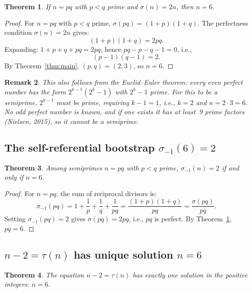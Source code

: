\documentclass{amsart}
\newtheorem{theorem}{Theorem}[section]
\newtheorem{remark}[theorem]{Remark}
\begin{document}
\begin{theorem}\label{thm:semiprime-perfect}
If $n = pq$ with $p < q$ prime and $\sigma(n) = 2n$, then $n = 6$.
\end{theorem}

\begin{proof}
For $n = pq$ with $p < q$ prime, $\sigma(pq) = (1+p)(1+q)$. The perfectness condition $\sigma(n) = 2n$ gives:
\[
(1 + p)(1 + q) = 2pq.
\]
Expanding: $1 + p + q + pq = 2pq$, hence $pq - p - q - 1 = 0$, i.e.,
\[
(p - 1)(q - 1) = 2.
\]
By Theorem~\ref{thm:main}, $(p, q) = (2, 3)$, so $n = 6$.
\end{proof}

\begin{remark}
This also follows from the Euclid--Euler theorem: every even perfect number has the form $2^{k-1}(2^k - 1)$ with $2^k - 1$ prime. For this to be a semiprime, $2^{k-1}$ must be prime, requiring $k - 1 = 1$, i.e., $k = 2$ and $n = 2 \cdot 3 = 6$. No odd perfect number is known, and if one exists it has at least~9 prime factors (Nielsen, 2015), so it cannot be a semiprime.
\end{remark}

\subsection{The self-referential bootstrap $\sigma_{-1}(6) = 2$}

\begin{theorem}\label{thm:sigma-neg1}
Among semiprimes $n = pq$ with $p < q$ prime, $\sigma_{-1}(n) = 2$ if and only if $n = 6$.
\end{theorem}

\begin{proof}
For $n = pq$, the sum of reciprocal divisors is:
\[
\sigma_{-1}(pq) = 1 + \frac{1}{p} + \frac{1}{q} + \frac{1}{pq} = \frac{(1+p)(1+q)}{pq} = \frac{\sigma(pq)}{pq}.
\]
Setting $\sigma_{-1}(pq) = 2$ gives $\sigma(pq) = 2pq$, i.e., $pq$ is perfect. By Theorem~\ref{thm:semiprime-perfect}, $pq = 6$.
\end{proof}

\subsection{$n - 2 = \tau(n)$ has unique solution $n = 6$}

\begin{theorem}\label{thm:n-minus-2}
The equation $n - 2 = \tau(n)$ has exactly one solution in the positive integers: $n = 6$.
\end{theorem}
\end{document}
